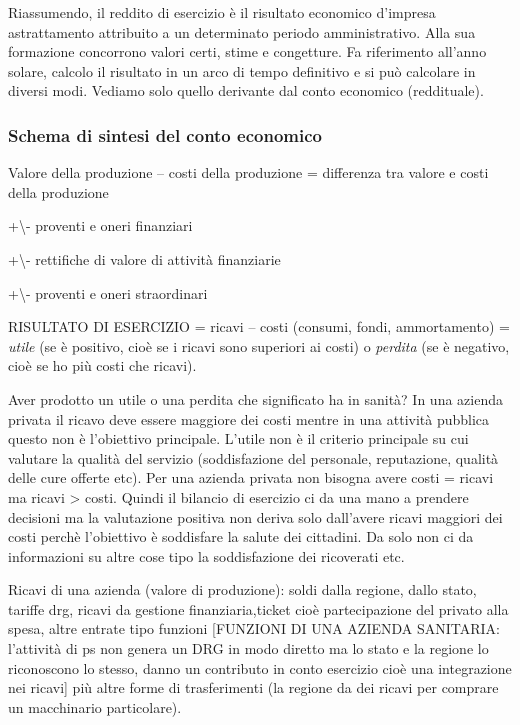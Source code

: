 Riassumendo, il reddito di esercizio è il risultato economico d'impresa
astrattamento attribuito a un determinato periodo amministrativo. Alla
sua formazione concorrono valori certi, stime e congetture. Fa
riferimento all'anno solare, calcolo il risultato in un arco di tempo
definitivo e si può calcolare in diversi modi. Vediamo solo quello
derivante dal conto economico (reddituale).

\subsubsection{Schema di sintesi del conto economico}

Valore della produzione -- costi della produzione = differenza tra
valore e costi della produzione

+\textbackslash{}- proventi e oneri finanziari

+\textbackslash{}- rettifiche di valore di attività finanziarie

+\textbackslash{}- proventi e oneri straordinari

RISULTATO DI ESERCIZIO = ricavi -- costi (consumi, fondi, ammortamento)
= \emph{utile} (se è positivo, cioè se i ricavi sono superiori ai costi)
o \emph{perdita} (se è negativo, cioè se ho più costi che ricavi).

Aver prodotto un utile o una perdita che significato ha in sanità? In
una azienda privata il ricavo deve essere maggiore dei costi mentre in
una attività pubblica questo non è l'obiettivo principale. L'utile non è
il criterio principale su cui valutare la qualità del servizio
(soddisfazione del personale, reputazione, qualità delle cure offerte
etc). Per una azienda privata non bisogna avere costi = ricavi ma ricavi
\textgreater{} costi. Quindi il bilancio di esercizio ci da una mano a
prendere decisioni ma la valutazione positiva non deriva solo dall'avere
ricavi maggiori dei costi perchè l'obiettivo è soddisfare la salute dei
cittadini. Da solo non ci da informazioni su altre cose tipo la
soddisfazione dei ricoverati etc.

Ricavi di una azienda (valore di produzione): soldi dalla regione, dallo
stato, tariffe drg, ricavi da gestione finanziaria,ticket cioè
partecipazione del privato alla spesa, altre entrate tipo funzioni
{[}FUNZIONI DI UNA AZIENDA SANITARIA: l'attività di ps non genera un DRG
in modo diretto ma lo stato e la regione lo riconoscono lo stesso, danno
un contributo in conto esercizio cioè una integrazione nei ricavi{]} più
altre forme di trasferimenti (la regione da dei ricavi per comprare un
macchinario particolare).

